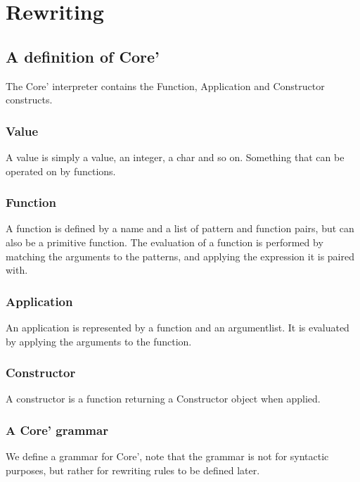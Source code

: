 



\chapter{Rewriting}

\section{A definition of Core'}

The Core' interpreter contains the Function, Application and Constructor constructs.

\subsection{Value}

A value is simply a value, an integer, a char and so on. Something that can be
operated on by functions.

\subsection{Function}

A function is defined by a name and a list of pattern and function pairs,
but can also be a primitive function.
The evaluation of a function is performed by matching the arguments to
the patterns, and applying the expression it is paired with.

\subsection{Application}

An application is represented by a function and an argumentlist. It is
evaluated by applying the arguments to the function.

\subsection{Constructor}

A constructor is a function returning a Constructor object when applied. 

\subsection{A Core' grammar}

We define a grammar for Core', note that the grammar is not for syntactic
purposes, but rather for rewriting rules to be defined later.

